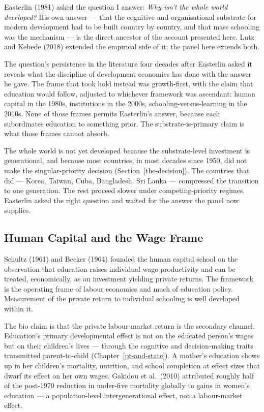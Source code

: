 \documentclass[12pt,letterpaper]{article}
\begin{document}
{Easterlin (1981) asked the question I answer: \emph{Why isn't the whole world developed?} His own answer --- that the cognitive and organisational substrate for modern development had to be built country by country, and that mass schooling was the mechanism --- is the direct ancestor of the account presented here. Lutz and Kebede (2018) extended the empirical side of it; the panel here extends both.

The question's persistence in the literature four decades after Easterlin asked it reveals what the discipline of development economics has done with the answer he gave. The frame that took hold instead was growth-first, with the claim that education would follow, adjusted to whichever framework was ascendant: human capital in the 1980s, institutions in the 2000s, schooling-versus-learning in the 2010s. None of those frames permits Easterlin's answer, because each subordinates education to something prior. The substrate-is-primary claim is what those frames cannot absorb.

The whole world is not yet developed because the substrate-level investment is generational, and because most countries, in most decades since 1950, did not make the singular-priority decision (Section~\ref{the-decision}). The countries that did --- Korea, Taiwan, Cuba, Bangladesh, Sri Lanka --- compressed the transition to one generation. The rest proceed slower under competing-priority regimes. Easterlin asked the right question and waited for the answer the panel now supplies.

\subsection{Human Capital and the Wage Frame}\label{human-capital-and-the-wage-frame}

Schultz (1961) and Becker (1964) founded the human capital school on the observation that education raises individual wage productivity and can be treated, economically, as an investment yielding private returns. The framework is the operating frame of labour economics and much of education policy. Measurement of the private return to individual schooling is well developed within it.

The bio claim is that the private labour-market return is the secondary channel. Education's primary developmental effect is not on the educated person's wages but on their children's lives --- through the cognitive and decision-making traits transmitted parent-to-child (Chapter~\ref{pt-and-state}). A mother's education shows up in her children's mortality, nutrition, and school completion at effect sizes that dwarf its effect on her own wages. Gakidou et al.\ (2010) attributed roughly half of the post-1970 reduction in under-five mortality globally to gains in women's education --- a population-level intergenerational effect, not a labour-market effect.

}
\end{document}
